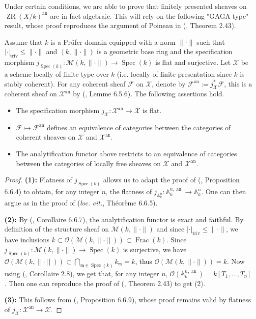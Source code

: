 \documentclass [11pt,reqno]{amsart}
\newcommand{\1}{\mathmybb{1}}
\def\cF{{\mathcal{F}}}
\def\cM{{\mathcal{M}}}
\def\cO{{\mathcal{O}}}
\def\cX{{\mathcal{X}}}
\def\m{\mathfrak m}
\def\an{\operatorname{an}}
\def\Frac{\operatorname{Frac}}
\def\Spec{\operatorname{Spec}}
\def\triv{\operatorname{triv}}
\def\ZR{\operatorname{ZR}}
\begin{document}
Under certain conditions, we are able to prove that finitely presented sheaves on $\ZR(X/k)^{\an}$ are in fact algebraic. This will rely on the following "GAGA type" result, whose proof reproduces the argument of Poineau in (\cite{Poineau25}, Theorem 2.43). 

\begin{proposition}
\label{prop:GAGA}
Assume that $k$ is a Prüfer domain equipped with a norm $\|\cdot\|$ such that $|\cdot|_{\triv}\leq \|\cdot\|$ and $(k,\|\cdot\|)$ is a geometric base ring and the specification morphism $j_{\Spec(k)} : \cM(k,\|\cdot\|)\to\Spec(k)$ is flat and surjective. Let $\cX$ be a scheme locally of finite type over $k$ (i.e. locally of finite presentation since $k$ is stably coherent). For any coherent sheaf $\cF$ on $\cX$, denote by $\cF^{\an}:=j_{\cX}^{\ast}\cF$, this is a coherent sheaf on $\cX^{\an}$ by (\cite{LemanissierPoineau24}, Lemme 6.5.6). The following assertions hold.
\begin{itemize}
	\item[(1)] The specification morphism $j_{\cX}:\cX^{\an}\to\cX$ is flat.
	\item[(2)] $\cF\mapsto \cF^{\an}$ defines an equivalence of categories between the categories of coherent sheaves on $\cX$ and $\cX^{\an}$.
	\item[(3)] The analytification functor above restricts to an equivalence of categories between the categories of locally free sheaves on $\cX$ and $\cX^{\an}$.
\end{itemize}
\end{proposition}

\begin{proof}
\textbf{(1):} Flatness of $j_{\Spec(k)}$ allows us to adapt the proof of (\cite{LemanissierPoineau24}, Proposition 6.6.4) to obtain, for any integer $n$, the flatness of $j_{\mathbb{A}^{n}_{k}} : \mathbb{A}^{n,\an}_{k} \to \mathbb{A}^{n}_{k}$. One can then argue as in the proof of (\emph{loc. cit.}, Théorème 6.6.5).

\textbf{(2):}  By (\cite{LemanissierPoineau24}, Corollaire 6.6.7), the analytification functor is exact and faithful. By definition of the structure sheaf on $\cM(k,\|\cdot\|)$ and since $|\cdot|_{\triv}\leq \|\cdot\|$, we have inclusions $k\subset \cO(\cM(k,\|\cdot\|))\subset \Frac(k)$. Since $j_{\Spec(k)} : \cM(k,\|\cdot\|)\to\Spec(k)$ is surjective, we have $\cO(\cM(k,\|\cdot\|))\subset \bigcap_{\m\in\Spec(k)}k_{\m}=k$, thus $\cO(\cM(k,\|\cdot\|))=k$. Now using (\cite{Poineau13a}, Corollaire 2.8), we get that, for any integer $n$, $\cO(\mathbb{A}^{n,\an}_{k})=k[T_{1},...,T_{n}]$. Then one can reproduce the proof of (\cite{Poineau25}, Theorem 2.43) to get (2).

\textbf{(3):} This follows from (\cite{LemanissierPoineau24}, Proposition 6.6.9), whose proof remains valid by flatness of $j_{\cX}:\cX^{\an}\to\cX$.
\end{proof}
\end{document}
